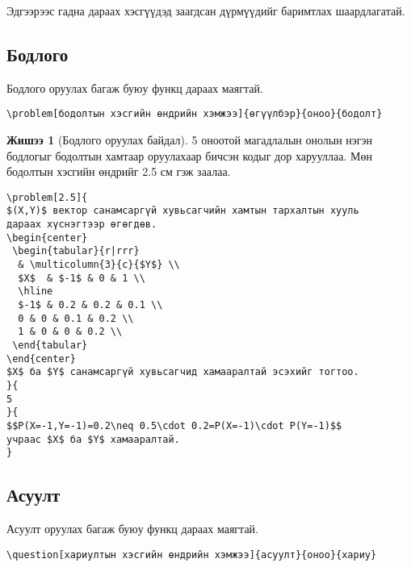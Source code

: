 \documentclass[10pt]{article}
\theoremstyle{definition}
\newtheorem{example}{Жишээ}
\begin{document}
\vspace{\baselineskip}

\par\noindent Эдгээрээс гадна дараах хэсгүүдэд заагдсан дүрмүүдийг баримтлах шаардлагатай.

\subsection{Бодлого}

Бодлого оруулах багаж буюу функц дараах маягтай.
\begin{verbatim}
\problem[бодолтын хэсгийн өндрийн хэмжээ]{өгүүлбэр}{оноо}{бодолт}
\end{verbatim}

\begin{example}[Бодлого оруулах байдал]
5 оноотой магадлалын онолын нэгэн бодлогыг бодолтын хамтаар оруулахаар бичсэн кодыг дор харууллаа. Мөн бодолтын хэсгийн өндрийг 2.5 см гэж заалаа.
\begin{verbatim}
\problem[2.5]{
$(X,Y)$ вектор санамсаргүй хувьсагчийн хамтын тархалтын хууль 
дараах хүснэгтээр өгөгдөв.
\begin{center}
 \begin{tabular}{r|rrr}
  & \multicolumn{3}{c}{$Y$} \\
  $X$  & $-1$ & 0 & 1 \\
  \hline
  $-1$ & 0.2 & 0.2 & 0.1 \\
  0 & 0 & 0.1 & 0.2 \\
  1 & 0 & 0 & 0.2 \\
 \end{tabular}
\end{center}
$X$ ба $Y$ санамсаргүй хувьсагчид хамааралтай эсэхийг тогтоо.
}{
5
}{
$$P(X=-1,Y=-1)=0.2\neq 0.5\cdot 0.2=P(X=-1)\cdot P(Y=-1)$$
учраас $X$ ба $Y$ хамааралтай.
}
\end{verbatim}
\end{example}

\subsection{Асуулт}

Асуулт оруулах багаж буюу функц дараах маягтай.
\begin{verbatim}
\question[хариултын хэсгийн өндрийн хэмжээ]{асуулт}{оноо}{хариу}
\end{verbatim}
\end{document}
